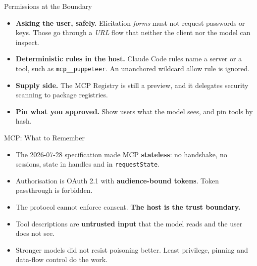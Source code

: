 \begin{frame}{Permissions at the Boundary}
    \begin{itemize}\itemsep0.5em
        \item \textbf{Asking the user, safely.} Elicitation \emph{forms} must not request passwords or keys. Those go through a \emph{URL} flow that neither the client nor the model can inspect.
        \item \textbf{Deterministic rules in the host.} Claude Code rules name a server or a tool, such as \texttt{mcp\_\_puppeteer}. An unanchored wildcard allow rule is ignored.
        \item \textbf{Supply side.} The MCP Registry is still a preview, and it \alert{delegates security scanning} to package registries.
        \item \textbf{Pin what you approved.} Show users what the model sees, and pin tools by hash.
    \end{itemize}
    \vspace{0.3em}
\end{frame}

\begin{frame}{MCP: What to Remember}
    \begin{itemize}\itemsep0.6em
        \item The 2026-07-28 specification made MCP \textbf{stateless}: no handshake, no sessions, state in handles and in \texttt{requestState}.
        \item Authorisation is OAuth 2.1 with \textbf{audience-bound tokens}. Token passthrough is forbidden.
        \item The protocol cannot enforce consent. \textbf{The host is the trust boundary.}
        \item Tool descriptions are \textbf{untrusted input} that the model reads and the user does not see.
        \item Stronger models did not resist poisoning better. Least privilege, pinning and data-flow control do the work.
    \end{itemize}
    \vspace{0.4em}
\end{frame}
